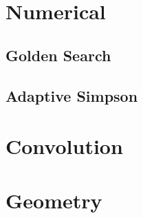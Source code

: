 \documentclass{article}
\begin{document}
\begin{multicols}{2}
    \section{Numerical}
    \subsection{Golden Search}
    
    \subsection{Adaptive Simpson}
    

    \section{Convolution}

    \section{Geometry}
\end{multicols}
\end{document}
